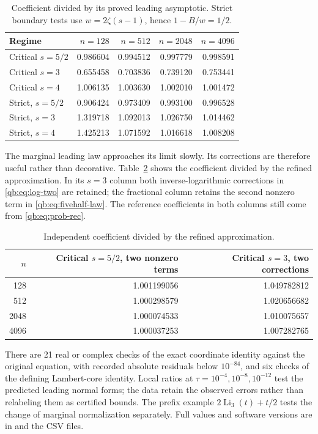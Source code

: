 \documentclass[11pt,a4paper]{article}
\theoremstyle{definition}\newtheorem{definition}[theorem]{Definition}
\theoremstyle{remark}\newtheorem{remark}[theorem]{Remark}
\newcommand{\Li}{\operatorname{Li}}
\numberwithin{equation}{section}
\begin{document}
\begin{table}[htbp]\centering
\caption{Coefficient divided by its proved leading asymptotic. Strict
boundary tests use $w=2\zeta(s-1)$, hence $1-B/w=1/2$.}
\label{qb:tab:leading}
\begin{tabular}{lrrrr}\toprule
Regime & $n=128$ & $n=512$ & $n=2048$ & $n=4096$\\\midrule
Critical $s=5/2$ & 0.986604 & 0.994512 & 0.997779 & 0.998591\\
Critical $s=3$ & 0.655458 & 0.703836 & 0.739120 & 0.753441\\
Critical $s=4$ & 1.006135 & 1.003630 & 1.002010 & 1.001472\\
Strict, $s=5/2$ & 0.906424 & 0.973409 & 0.993100 & 0.996528\\
Strict, $s=3$ & 1.319718 & 1.092013 & 1.026750 & 1.014462\\
Strict, $s=4$ & 1.425213 & 1.071592 & 1.016618 & 1.008208\\\bottomrule
\end{tabular}
\end{table}

The marginal leading law approaches its limit slowly. Its corrections are
therefore useful rather than decorative. Table~\ref{qb:tab:refinement}
shows the coefficient divided by the refined approximation. In its
$s=3$ column both inverse-logarithmic corrections in
\eqref{qb:eq:log-two} are retained; the fractional column retains the
second nonzero term in \eqref{qb:eq:fivehalf-law}. The reference
coefficients in both columns still come from \eqref{qb:eq:prob-rec}.

\begin{table}[htbp]\centering
\caption{Independent coefficient divided by the refined approximation.}
\label{qb:tab:refinement}
\begin{tabular}{rrr}\toprule
$n$ & Critical $s=5/2$, two nonzero terms & Critical $s=3$, two corrections\\\midrule
128 & 1.001199056 & 1.049782812\\
512 & 1.000298579 & 1.020656682\\
2048 & 1.000074533 & 1.010075657\\
4096 & 1.000037253 & 1.007282765\\\bottomrule
\end{tabular}
\end{table}

There are 21 real or complex checks of the exact coordinate identity
against the original equation, with recorded absolute residuals below
$10^{-84}$, and six checks of the defining Lambert-core identity. Local
ratios at $\tau=10^{-4},10^{-8},10^{-12}$ test the predicted leading
normal forms; the data retain the observed errors rather than relabeling
them as certified bounds. The prefix example
$2\Li_3(t)+t/2$ tests the change of marginal normalization separately.
Full values and software versions are in 
and the CSV files.
\end{document}
